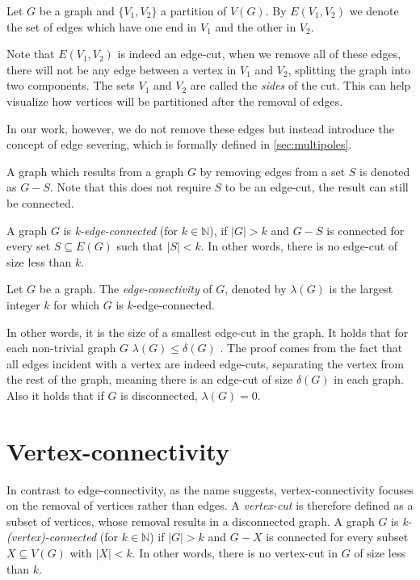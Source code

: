 \documentclass[12pt, twoside]{book}
\begin{document}
\begin{definition}
	Let $G$ be a graph and $\{V_1,V_2\}$ a partition of $V(G)$. By $E(V_1,V_2)$ we denote the set of edges which have one end in $V_1$ and the other in $V_2$.
\end{definition}

Note that $E(V_1,V_2)$ is indeed an edge-cut, when we remove all of these edges, there will not be any edge between a vertex in $V_1$ and $V_2$, splitting the graph into two components. The sets $V_1$ and $V_2$ are called the \textit{sides} of the cut. This can help visualize how vertices will be partitioned after the removal of edges.

In our work, however, we do not remove these edges but instead introduce the concept of edge severing, which is formally defined in \cref{sec:multipoles}.

A graph which results from a graph $G$ by removing edges from a set $S$ is denoted as $G-S$. Note that this does not require $S$ to be an edge-cut, the result can still be connected.

A graph $G$ is \textit{k-edge-connected} (for $k\in\mathbb{N}$), if $|G|>k$ and $G-S$ is connected for every set $S\subseteq E(G)$ such that $|S|<k$. In other words, there is no edge-cut of size less than $k$.

\begin{definition}
	Let $G$ be a graph. The \textit{edge-conectivity} of $G$, denoted by $\lambda(G)$ is the largest integer $k$ for which $G$ is $k$-edge-connected.
\end{definition}

In other words, it is the size of a smallest edge-cut in the graph. It holds that for each non-trivial graph $G$ $\lambda(G)\leq\delta(G)$ \cite{Diestel}. The proof comes from the fact that all edges incident with a vertex are indeed edge-cuts, separating the vertex from the rest of the graph, meaning there is an edge-cut of size $\delta(G)$ in each graph. Also it holds that if $G$ is disconnected, $\lambda(G)=0$.

\section{Vertex-connectivity}

In contrast to edge-connectivity, as the name suggests, vertex-connectivity focuses on the removal of vertices rather than edges. A \textit{vertex-cut} is therefore defined as a subset of vertices, whose removal results in a disconnected graph. A graph $G$ is \textit{k-(vertex)-connected} (for $k\in\mathbb{N}$) if $|G|>k$ and $G-X$ is connected for every subset $X\subseteq V(G)$ with $|X|<k$. In other words, there is no vertex-cut in $G$ of size less than $k$.
\end{document}
